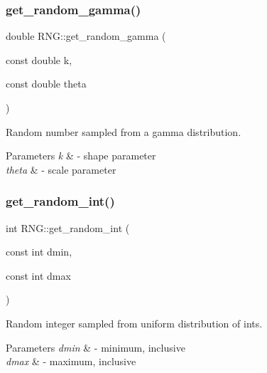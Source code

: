 \subsubsection{\texorpdfstring{get\+\_\+random\+\_\+gamma()}{get\_random\_gamma()}}
{\footnotesize\ttfamily double R\+N\+G\+::get\+\_\+random\+\_\+gamma (\begin{DoxyParamCaption}\item[{const double}]{k,  }\item[{const double}]{theta }\end{DoxyParamCaption})\hspace{0.3cm}{\ttfamily [inline]}}



Random number sampled from a gamma distribution. 


\begin{DoxyParams}{Parameters}
{\em k} & -\/ shape parameter \\
\hline
{\em theta} & -\/ scale parameter \\
\hline
\end{DoxyParams}
\mbox{\label{classRNG_a9f4c1cb8ca99c2838de7077f2a0c48ef}} 
\subsubsection{\texorpdfstring{get\+\_\+random\+\_\+int()}{get\_random\_int()}}
{\footnotesize\ttfamily int R\+N\+G\+::get\+\_\+random\+\_\+int (\begin{DoxyParamCaption}\item[{const int}]{dmin,  }\item[{const int}]{dmax }\end{DoxyParamCaption})\hspace{0.3cm}{\ttfamily [inline]}}



Random integer sampled from uniform distribution of ints. 


\begin{DoxyParams}{Parameters}
{\em dmin} & -\/ minimum, inclusive \\
\hline
{\em dmax} & -\/ maximum, inclusive \\
\hline
\end{DoxyParams}
\mbox{\label{classRNG_a45c08c830077f4ad9c9a41ec2ab36021}} 
